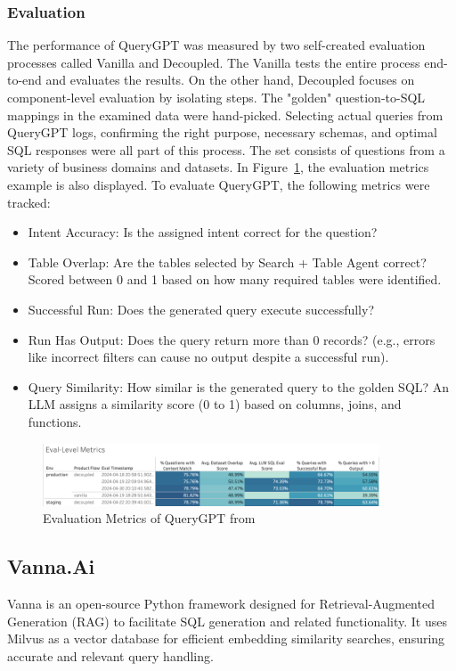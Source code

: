         \subsubsection{Evaluation}
        The performance of QueryGPT was measured by two self-created evaluation processes called Vanilla and Decoupled. The Vanilla tests the entire process end-to-end and evaluates the results. On the other hand, Decoupled focuses on component-level evaluation by isolating steps. The "golden" question-to-SQL mappings in the examined data were hand-picked. Selecting actual queries from QueryGPT logs, confirming the right purpose, necessary schemas, and optimal SQL responses were all part of this process. The set consists of questions from a variety of business domains and datasets. In Figure~\ref{fig:query-gpt-metrics}, the evaluation metrics example is also displayed.
        To evaluate QueryGPT, the following metrics were tracked:
        \begin{itemize}
            \item  Intent Accuracy: Is the assigned intent correct for the question?
            \item  Table Overlap: Are the tables selected by Search + Table Agent correct? Scored between 0 and 1 based on how many required tables were identified.
            \item  Successful Run: Does the generated query execute successfully?
            \item  Run Has Output: Does the query return more than 0 records? (e.g., errors like incorrect filters can cause no output despite a successful run).
            \item  Query Similarity: How similar is the generated query to the golden SQL? An LLM assigns a similarity score (0 to 1) based on columns, joins, and functions.
        \end{itemize}
        \begin{figure}[H]
            \centering
            \includegraphics[width=10cm]{chapters/2/figures/query-gpt-metrics.png}
            \caption[Evaluation Metrics of QueryGPT]{Evaluation Metrics of QueryGPT  from~\cite{QueryGPT}}
            \label{fig:query-gpt-metrics}
        \end{figure}
    \subsection{Vanna.Ai}
    Vanna is an open-source Python framework designed for Retrieval-Augmented Generation (RAG) to facilitate SQL generation and related functionality. It uses Milvus as a vector database for efficient embedding similarity searches, ensuring accurate and relevant query handling.

